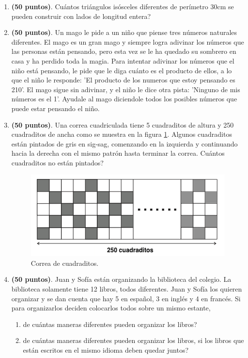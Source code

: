 \begin{enumerate}
	\item \textbf{(50 puntos)}.  Cuántos triángulos isósceles diferentes de perímetro 30cm se pueden construir con lados de longitud entera? 
			
	\item \textbf{(50 puntos)}. Un mago le pide a un niño que piense tres números naturales diferentes. El mago es un gran mago y siempre logra adivinar los números que las personas están pensando, pero esta vez se le ha quedado su sombrero en casa y ha perdido toda la magia. Para intentar adivinar los números que el niño está pensando, le pide que le diga cuánto es el producto de ellos, a lo que el niño le responde: 'El producto de los numeros que estoy pensando es  210'. El mago sigue sin adivinar, y el niño le dice otra pista: 'Ninguno de mis números es el 1'. Ayudale al mago diciendole todos los posibles números que puede estar pensando el niño.
			
	
	\item \textbf{(50 puntos)}. Una correa cuadriculada tiene 5 cuadraditos de altura y 250 cuadraditos de ancha como se muestra en la figura \ref{fig:correa_cuadraditos}. Algunos cuadraditos están pintados de gris en sig-sag, comenzando en la izquierda y continuando hacia la derecha con el mismo patrón hasta terminar la correa. Cuántos cuadraditos no están pintados?
				
	\begin{figure}[H]
		\centering
		\includegraphics[width=0.8\linewidth]{2020_10_10/imgs/basico_faja_cuadraditos}
		\caption{Correa de cuadraditos.}
		\label{fig:correa_cuadraditos}
	\end{figure}

	\item \textbf{(50 puntos)}. Juan y Sofía están organizando la biblioteca del colegio. La biblioteca solamente tiene 12 libros, todos diferentes. Juan y Sofía los quieren organizar y se dan cuenta que hay 5 en español, 3 en inglés y 4 en francés. Si para organizarlos deciden colocarlos todos sobre un mismo estante,
	\begin{enumerate}[label=\Alph*)]
		\item de cuántas maneras diferentes pueden organizar los libros?
		\item de cuántas maneras diferentes pueden organizar los libros, si los libros que están escritos en el mismo idioma deben quedar juntos?
	\end{enumerate}
		

\end{enumerate}
